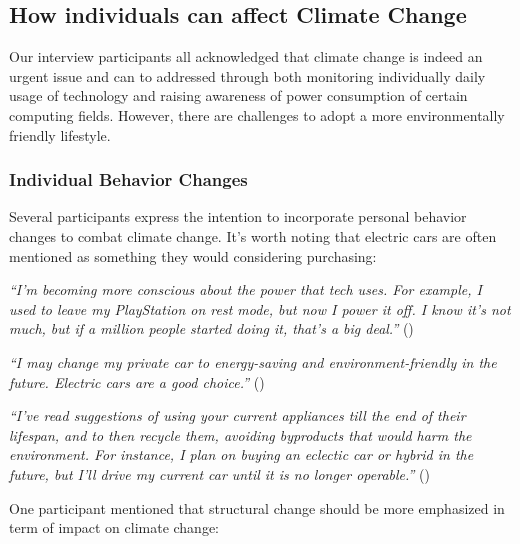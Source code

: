     \subsection{How individuals can affect Climate Change}
    
    Our interview participants all acknowledged that climate change is indeed an urgent issue and can to addressed through both monitoring individually daily usage of technology and raising awareness of power consumption of certain computing fields. However, there are challenges to adopt a more environmentally friendly lifestyle.
    
    \subsubsection{Individual Behavior Changes}
    
    Several participants express the intention to incorporate personal behavior changes to combat climate change. It's worth noting that electric cars are often mentioned as something they would considering purchasing:
    
    \begin{quoting}
        \textit{``I'm becoming more conscious about the power that tech uses. For example, I used to leave my PlayStation on rest mode, but now I power it off. I know it's not much, but if a million people started doing it, that's a big deal.''} () %
    \end{quoting}
    
    \begin{quoting}
        \textit{``I may change my private car to energy-saving and environment-friendly in the future. Electric cars are a good choice.''} ()
    \end{quoting}
    

    \begin{quoting}
        \textit{``I've read suggestions of using your current appliances till the end of their lifespan, and to then recycle them, avoiding byproducts that would harm the environment. For instance, I plan on buying an eclectic car or hybrid in the future, but I'll drive my current car until it is no longer operable.''} ()
    \end{quoting}
    
    One participant mentioned that structural change should be more emphasized in term of impact on climate change:
    
